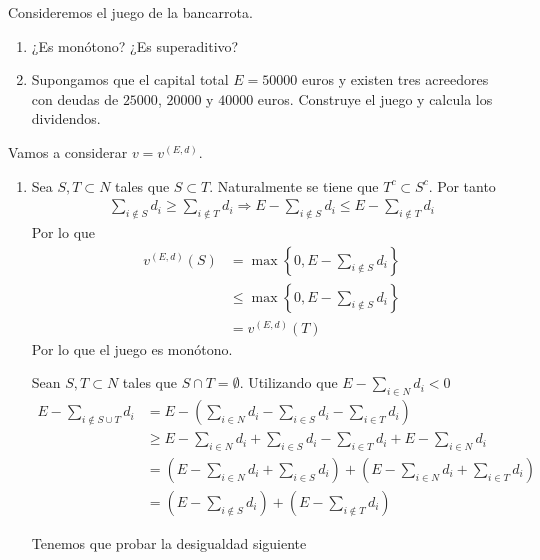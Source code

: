 \documentclass[twoside]{article}
\begin{document}
\begin{ejercicio}{2}Consideremos el juego de la bancarrota.
\begin{enumerate}
\item ¿Es monótono? ¿Es superaditivo?
\item Supongamos que el capital total $E=50000$ euros y existen tres acreedores con deudas de $25000$, $20000$ y $40000$ euros. Construye el juego y calcula los dividendos.
\end{enumerate} 
\end{ejercicio}
\begin{solucion}
Vamos a considerar $v = v^{(E,d)}$.
\begin{enumerate}
\item Sea $S,T \subset N$ tales que $S\subset T$. Naturalmente se tiene que $T^c \subset S^c$. Por tanto
\begin{gather*}
\sum_{i \notin S} d_i \geq \sum_{i \notin T} d_i \Rightarrow E -\sum_{i \notin S} d_i \leq E - \sum_{i \notin T} d_i
\end{gather*} 
Por lo que
\begin{align*}
v^{(E,d)}_{}(S) &= \max\left\{0,E-\sum_{i\notin S} d_i\right\}\\
&\leq \max\left\{0,E-\sum_{i\notin S} d_i\right\} \\
&= v^{(E,d)}(T)
\end{align*}
Por lo que el juego es monótono.

Sean $S,T\subset N$ tales que $S\cap T = \emptyset$. Utilizando que $E-\sum_{i\in N} d_i < 0$
\begin{align*}
E - \sum_{i \notin S\cup T} d_i &=  E - \left(\sum_{i \in N} d_i-\sum_{i \in S} d_i-\sum_{i \in T} d_i\right) \\
& \geq  E - \sum_{i \in N} d_i+\sum_{i \in S} d_i-\sum_{i \in T} d_i + E - \sum_{i\in N} d_i\\
& = \left(E - \sum_{i \in N} d_i + \sum_{i \in S} d_i \right) + \left(E- \sum_{i \in N} d_i  + \sum_{i \in  T} d_i \right) \\
&= \left(E - \sum_{i \notin S} d_i \right) + \left(E- \sum_{i \notin  T} d_i \right) 
\end{align*}

Tenemos que probar la desigualdad siguiente


\end{enumerate}
\end{solucion}
\end{document}
